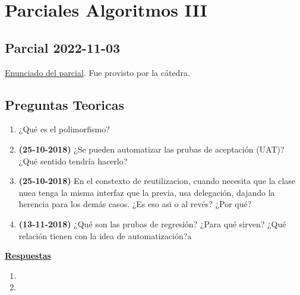 \documentclass[../main.tex]{subfiles}
\begin{document}
\section{Parciales Algoritmos III}
    \subsection{Parcial 2022-11-03}
        \href{https://github.com/fiuba/algo3_parciales/blob/master/parciales/2022-11-03/enunciado.pdf}{Enunciado del parcial}. Fue provisto por la cátedra.
        \begin{example}
            
        \end{example}

    \subsection{Preguntas Teoricas}
        \begin{enumerate}
            \item ¿Qué es el polimorfismo?
            \item \textbf{(25-10-2018)} ¿Se pueden automatizar las prubas de aceptación (UAT)? ¿Qué sentido tendría hacerlo?
            \item \textbf{(25-10-2018)} En el constexto de reutilizacion, cuando necesita que la clase nuea tenga la misma interfaz que la previa, usa delegación, dajando la herencia para los demás casos. ¿Es eso asi o al revés? ¿Por qué?
            \item \textbf{(13-11-2018)} ¿Qué son las prubas de regresión? ¿Para qué sirven? ¿Qué relación tienen con la idea de automatización?a
        \end{enumerate}

        \underline{\textbf{Respuestas}}
        \begin{enumerate}
            \item 

            \item 
        \end{enumerate}
        
\end{document}

